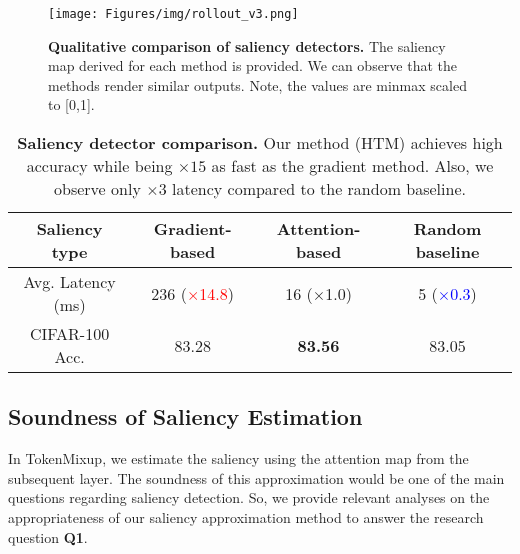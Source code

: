 \documentclass{article}
\begin{document}
\begin{figure}[t]
\begin{center}
\texttt{[image: Figures/img/rollout\_v3.png]}
\end{center}
\vspace{-3mm}
\caption{\footnotesize \textbf{Qualitative comparison of saliency detectors.} The saliency map derived for each method is provided. We can observe that the methods render similar outputs. Note, the values are minmax scaled to [0,1].}
\label{fig:rollout}
\end{figure} \begin{table}

\centering
\caption{\footnotesize \textbf{Saliency detector comparison.} Our method (HTM) achieves high accuracy while being $\times15$ as fast as the gradient method. Also, we observe only $\times3$ latency compared to the random baseline.}
\label{tab:saliency_map}
\begin{adjustbox}{width=0.8\textwidth}
\begin{tabular}{c|ccc}
\hline
\rule{0pt}{1.0\normalbaselineskip}
\cellcolor{gray!10}Saliency type & \cellcolor{gray!10}\textbf{Gradient-based} & \cellcolor{gray!10}\textbf{Attention-based} &\cellcolor{gray!10} \textbf{Random baseline} 
\rule{0pt}{1.0\normalbaselineskip}\\
\hline
\rule{0pt}{1.0\normalbaselineskip}
Avg. Latency (ms) & 236 {\footnotesize (\textcolor{red}{$\times$14.8})} & 16 {\footnotesize ($\times$1.0)} & 5 {\footnotesize (\textcolor{blue}{$\times$0.3})} \rule{0pt}{1.0\normalbaselineskip}\\
\rule{0pt}{1.0\normalbaselineskip}
CIFAR-100 Acc. & 83.28 &  \textbf{83.56} & 83.05
\rule{0pt}{1.0\normalbaselineskip}\\ \hline
\end{tabular}
\end{adjustbox}
\end{table}

%
 \subsection{Soundness of Saliency Estimation}
\label{sec:sal_sound}
\vspace{-2mm}
In TokenMixup, we estimate the saliency using the attention map from the subsequent layer.
The soundness of this approximation would be one of the main questions regarding saliency detection.
So, we provide relevant analyses on the appropriateness of our saliency approximation method to answer the research question \textbf{Q1}.
\end{document}
